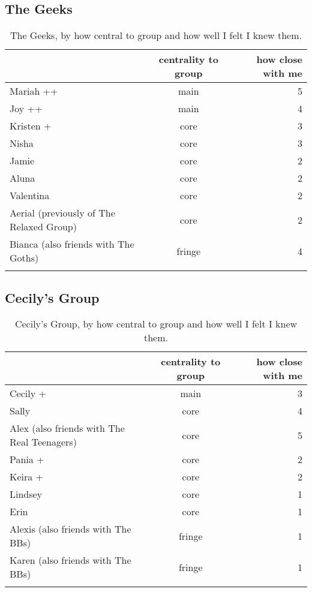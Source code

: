 \subsection{The Geeks}
\nopagebreak
\begin{table}[ht]
\caption{The Geeks, by how central to group and how well I felt I knew them.}\label{append:Geeks}
	\centering
		\begin{tabular}{p{3.5cm}cr} \\
		\lsptoprule
			\multirow{2}{*}{\sc name} & \multicolumn{1}{p{2cm}}{\centering \sc centrality to group} & \multicolumn{1}{p{1.75cm}}{\centering \sc how close with me}  \\
		\midrule
Mariah ++ & main & 5 \\
Joy ++   & main & 4 \\
Kristen + & core & 3 \\
Nisha  &  core  &  3 \\
Jamie  & core & 2 \\
Aluna & core & 2 \\
Valentina & core & 2 \\
Aerial (previously of The Relaxed Group) & core & 2 \\
Bianca (also friends with The Goths) & fringe & 4 \\
   \lspbottomrule
				\end{tabular}
\end{table}


\subsection{Cecily's Group}
\begin{table}[H]
\caption{Cecily's Group, by how central to group and how well I felt I knew them.}\label{append:Cecily}
	\centering
		\begin{tabular}{p{3.5cm}cr} \\
		\lsptoprule
			\multirow{2}{*}{\sc name} & \multicolumn{1}{p{2cm}}{\centering \sc centrality to group} & \multicolumn{1}{p{1.75cm}}{\centering \sc how close with me}  \\
		\midrule
Cecily + & main & 3 \\
Sally & core & 4 \\
Alex (also friends with The Real Teenagers) & core & 5 \\
Pania + & core & 2 \\
Keira + & core & 2 \\
Lindsey & core & 1 \\
Erin & core & 1 \\
Alexis (also friends with The BBs) & fringe & 1 \\
Karen (also friends with The BBs) & fringe & 1 \\
   \lspbottomrule
				\end{tabular}
\end{table}
 
